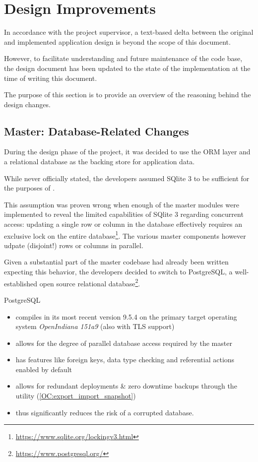 \section{Design Improvements}

In accordance with the project supervisor, a text-based delta between the original and implemented application design
is beyond the scope of this document.

However, to facilitate understanding and future maintenance of the code base, the design document has been updated to the state of
the implementation at the time of writing this document.

The purpose of this section is to provide an overview of the reasoning behind the design changes.


\subsection{Master: Database-Related Changes}

During the design phase of the project, it was decided to use the  ORM layer and a relational database as the backing store
for \mamid application data.

While never officially stated, the developers assumed SQlite 3 to be sufficient for the purposes of \mamid.

This assumption was proven wrong when enough of the master modules were implemented to reveal the limited capabilities of SQlite 3 regarding
concurrent access: updating a single row or column in the database effectively requires an exclusive lock on the entire 
database\footnote{\url{https://www.sqlite.org/lockingv3.html}}.
The various master components however udpate (disjoint!) rows or columns in parallel.

Given a substantial part of the master codebase had already been written expecting this behavior, the developers decided to switch to
PostgreSQL, a well-established open source relational database\footnote{\url{https://www.postgresql.org/}}.

PostgreSQL
\begin{itemize}
\item compiles in its most recent version 9.5.4 on the primary target operating system \textit{OpenIndiana 151a9} (also with TLS support)
\item allows for the degree of parallel database access required by the master
\item has features like foreign keys, data type checking and referential actions enabled by default %
\item allows for redundant deployments \& zero downtime backups through the  utility 
(\ref{OC:export_import_snapshot})
\item thus significantly reduces the risk of a corrupted database.
\end{itemize}

